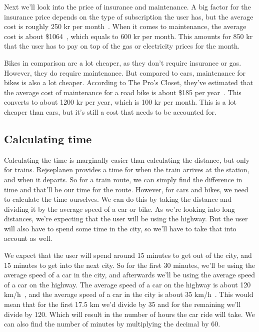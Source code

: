 Next we'll look into the price of insurance and maintenance.
A big factor for the insurance price depends on the type of subscription the user has, but the average cost is roughly
250 kr per month~\cite{price_insurance}.
When it comes to maintenance, the average cost is about \$1064~\cite{price_repair}, which equals to 600 kr per month.
This amounts for 850 kr that the user has to pay on top of the gas or electricity prices for the month.

Bikes in comparison are a lot cheaper, as they don't require insurance or gas.
However, they do require maintenance.
But compared to cars, maintenance for bikes is also a lot cheaper.
According to The Pro's Closet, they've estimated that the average cost of maintenance for a road bike is about \$185 per
year~\cite{price_bike}.
This converts to about 1200 kr per year, which is 100 kr per month.
This is a lot cheaper than cars, but it's still a cost that needs to be accounted for.

\subsection{Calculating time}\label{subsec:calculating-time}

Calculating the time is marginally easier than calculating the distance, but only for trains.
Rejseplanen provides a time for when the train arrives at the station, and when it departs.
So for a train route, we can simply find the difference in time and that'll be our time for the route.
However, for cars and bikes, we need to calculate the time ourselves.
We can do this by taking the distance and dividing it by the average speed of a car or bike.
As we're looking into long distances, we're expecting that the user will be using the highway.
But the user will also have to spend some time in the city, so we'll have to take that into account as well.

We expect that the user will spend around 15 minutes to get out of the city, and 15 minutes to get into the next city.
So for the first 30 minutes, we'll be using the average speed of a car in the city, and afterwards we'll be using the
average speed of a car on the highway.
The average speed of a car on the highway is about 120 km/h~\cite{time_highway}, and the average speed of a car in
the city is about 35 km/h~\cite{time_city}.
This would mean that for the first 17.5 km we'd divide by 35 and for the remaining we'll divide by 120.
Which will result in the number of hours the car ride will take.
We can also find the number of minutes by multiplying the decimal by 60.

